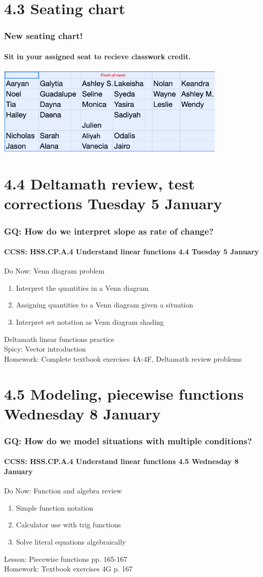 \documentclass{beamer}
\begin{document}
\section{4.3 Seating chart}
\frame
{
  \frametitle{New seating chart!}
  \framesubtitle{Sit in your assigned seat to recieve classwork credit.}

\includegraphics[width=11cm]{IB-seating-chart.png}
}

\section{4.4 Deltamath review, test corrections Tuesday 5 January}
\frame
{
  \frametitle{GQ: How do we interpret slope as rate of change?}
  \framesubtitle{CCSS: HSS.CP.A.4 Understand linear functions \hfill \alert{4.4 Tuesday 5 January}}

  \begin{block}{Do Now: Venn diagram problem}
  \begin{enumerate}
    \item Interpret the quantities in a Venn diagram
    \item Assigning quantities to a Venn diagram given a situation
    \item Interpret set notation as Venn diagram shading
  \end{enumerate}
  \end{block}
  Deltamath linear functions practice \\ \bigskip
  Spicy: Vector introduction \\ \smallskip
  Homework: Complete textbook exercises 4A-4F, Deltamath review problems
}

\section{4.5 Modeling, piecewise functions Wednesday 8 January}
\frame
{
  \frametitle{GQ: How do we model situations with multiple conditions?}
  \framesubtitle{CCSS: HSS.CP.A.4 Understand linear functions \hfill \alert{4.5 Wednesday 8 January}}

  \begin{block}{Do Now: Function and algebra review}
  \begin{enumerate}
      \item Simple function notation
      \item Calculator use with trig functions
      \item Solve literal equations algebraically 
  \end{enumerate}
  \end{block}
  Lesson: Piecewise functions pp. 165-167 \\ \smallskip
  Homework: Textbook exercises 4G p. 167
}
\end{document}
